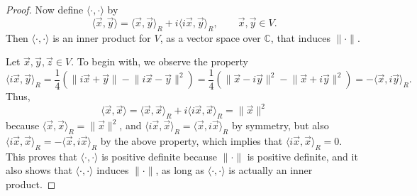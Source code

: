 \documentclass{homework}
\begin{document}
\begin{proof}
		Now define $\langle\cdot,\cdot\rangle$ by
		\begin{equation*}
			\langle\vec{x},\vec{y}\rangle = \langle\vec{x},\vec{y}\rangle_R+ i\langle i\vec{x}, \vec{y}\rangle_R, \qquad \vec{x},\vec{y}\in V.
		\end{equation*}
		Then $\langle\cdot,\cdot\rangle$ is an inner product for $V$, as a vector space over $\mathbb{C}$, that induces $\lVert\cdot\rVert$.
		
		Let $\vec{x}, \vec{y}, \vec{z}\in V$. To begin with, we observe the property
		\begin{equation*}
			\langle i\vec{x},\vec{y}\rangle_R = \frac{1}{4}\left(\lVert i\vec{x} + \vec{y}\rVert - \lVert i\vec{x} - \vec{y}\rVert^2\right) = \frac{1}{4}\left(\lVert \vec{x} - i\vec{y}\rVert^2 - \lVert \vec{x} + i\vec{y}\rVert^2\right) = -\langle \vec{x}, i\vec{y}\rangle_R.
		\end{equation*}
		Thus,
		\begin{equation*}
			\langle \vec{x}, \vec{x}\rangle = \langle\vec{x}, \vec{x}\rangle_R + i\langle i\vec{x},\vec{x}\rangle_R = \lVert \vec{x}\rVert^2
		\end{equation*}
		because $\langle\vec{x},\vec{x}\rangle_R = \lVert \vec{x}\rVert^2$, and $\langle i\vec{x}, \vec{x}\rangle_R = \langle \vec{x},i\vec{x}\rangle_R$ by symmetry, but also $\langle i\vec{x}, \vec{x}\rangle_R = -\langle \vec{x}, i\vec{x} \rangle_R$ by the above property, which implies that $\langle i\vec{x},\vec{x}\rangle_R = 0$.
		This proves that $\langle\cdot,\cdot\rangle$ is positive definite because $\lVert \cdot\rVert$ is positive definite, and it also shows that $\langle\cdot,\cdot\rangle$ induces $\lVert\cdot\rVert$, as long as $\langle\cdot,\cdot\rangle$ is actually an inner product.
		

\end{proof}
\end{document}
